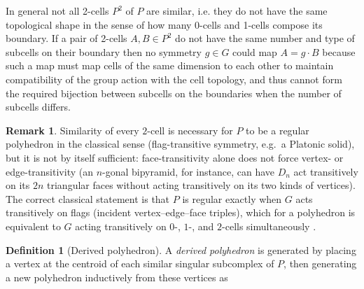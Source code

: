 \documentclass{amsart}
\theoremstyle{plain}
\theoremstyle{definition}
\newtheorem*{definition}{Definition}
\newtheorem*{remark}{Remark}
\begin{document}
 In general not all 2-cells $P^2$ of $P$ are similar, i.e. they do not have the same topological shape in the sense of how many 0-cells and 1-cells compose its boundary. If a pair of 2-cells $A,B\in P^2$ do not have the same number and type of subcells on their boundary then no symmetry $g\in G$ could map $A=g\cdot B$ because such a map must map cells of the same dimension to each other to maintain compatibility of the group action with the cell topology, and thus cannot form the required bijection between subcells on the boundaries when the number of subcells differs.
 \begin{remark}
     Similarity of every $2$-cell is necessary for $P$ to be a regular polyhedron in the classical sense (flag-transitive symmetry, e.g.\ a Platonic solid), but it is not by itself sufficient: face-transitivity alone does not force vertex- or edge-transitivity (an $n$-gonal bipyramid, for instance, can have $D_n$ act transitively on its $2n$ triangular faces without acting transitively on its two kinds of vertices). The correct classical statement is that $P$ is regular exactly when $G$ acts transitively on flags (incident vertex--edge--face triples), which for a polyhedron is equivalent to $G$ acting transitively on $0$-, $1$-, and $2$-cells simultaneously \cite{coxeter1973}.
 \end{remark}
 \begin{definition}[Derived polyhedron]
    A \emph{derived polyhedron} is generated by placing a vertex at the centroid of each similar singular subcomplex of $P$, then generating a new polyhedron inductively from these vertices as
 \end{definition}
 
\end{document}
